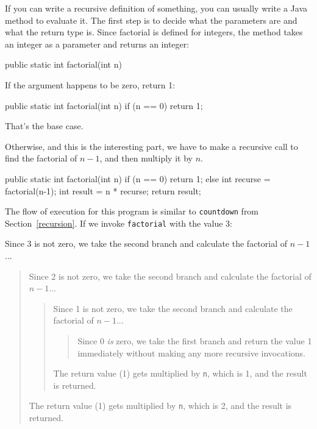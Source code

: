 If you can write a recursive definition of something, you can usually
write a Java method to evaluate it.  The first step is to decide what
the parameters are and what the return type is.  Since factorial is
defined for integers, the method takes an
integer as a parameter and returns an integer:

\begin{code}
  public static int factorial(int n) {
  }
\end{code}

\noindent If the argument happens to be zero, return 1:

\begin{code}
  public static int factorial(int n) {
    if (n == 0) {
      return 1;
    }
  }
\end{code}

That's the base case.

Otherwise, and this is the interesting part, we have to make
a recursive call to find the factorial of $n-1$, and then
multiply it by $n$.

\begin{code}
  public static int factorial(int n) {
    if (n == 0) {
      return 1;
    } else {
      int recurse = factorial(n-1);
      int result = n * recurse;
      return result;
    }
  }
\end{code}

The flow of execution for this program is similar to {\tt countdown}
from Section~\ref{recursion}.
If we invoke {\tt factorial} with the value 3:

Since 3 is not zero, we take the second branch and calculate
the factorial of $n-1$...

\begin{quote}
Since 2 is not zero, we take the second branch and calculate
the factorial of $n-1$...

\begin{quote}
Since 1 is not zero, we take the second branch and calculate
the factorial of $n-1$...

\begin{quote}
Since 0 {\em is} zero, we take the first branch and return
the value 1 immediately without making any more recursive
invocations.

\end{quote}

The return value (1) gets multiplied by {\tt n}, which is 1,
and the result is returned.

\end{quote}

The return value (1) gets multiplied by {\tt n}, which is 2,
and the result is returned.

\end{quote}

